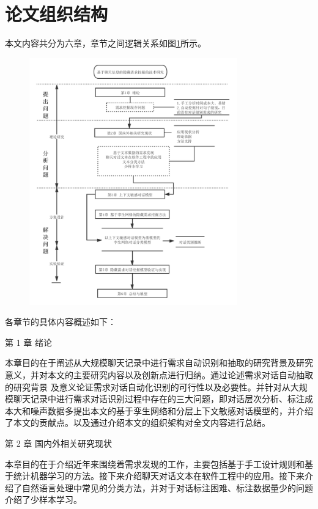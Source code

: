 \section{论文组织结构}
本文内容共分为六章，章节之间逻辑关系如图\ref{fig:chapters}所示。
\begin{figure}[htb]
    \centering
    \includegraphics[width=0.8\textwidth]{Img/chapters.pdf}
    \label{fig:chapters}
\end{figure}

各章节的具体内容概述如下： 

第 1 章 绪论 

本章目的在于阐述从大规模聊天记录中进行需求自动识别和抽取的研究背景及研究意义，并对本文的主要研究内容以及创新点进行归纳。通过论述需求对话自动抽取的研究背景
及意义论证需求对话自动化识别的可行性以及必要性。并针对从大规模聊天记录中进行需求对话识别过程中存在的三大问题，即对话层次分析、标注成本大和噪声数据多提出本文的基于孪生网络和分层上下文敏感对话模型{\dm}的{\tool}，并介绍了本文的贡献点。以及通过介绍本文的组织架构对全文内容进行总结。 

第 2 章 国内外相关研究现状

本章目的在于介绍近年来围绕着需求发现的工作，主要包括基于手工设计规则和基于统计机器学习的方法。接下来介绍聊天对话文本在软件工程中的应用。接下来介绍了自然语言处理中常见的分类方法，并对于对话标注困难、标注数据量少的问题介绍了少样本学习。

